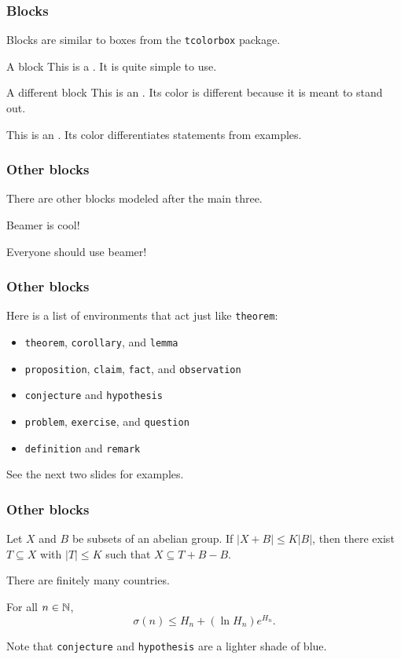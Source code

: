 \documentclass[mathserif]{beamer}
\begin{document}
\begin{frame}\frametitle{Blocks}
	Blocks are similar to boxes from the \texttt{tcolorbox} package.
	\begin{block}{A block}
		This is a . It is quite simple to use.
	\end{block}
	\pause
	\begin{alertblock}{A different block}
		This is an . Its color is different because it is meant to stand out.
	\end{alertblock}
	\pause
	\begin{examples}
		This is an . Its color differentiates statements from examples.
	\end{examples}
\end{frame}

\begin{frame}\frametitle{Other blocks}
	There are other blocks modeled after the main three.
	\pause
	\begin{theorem}
		Beamer is cool!
	\end{theorem}
	\begin{corollary}[Wright, 2003]
		Everyone should use beamer!
	\end{corollary}
\end{frame}

\begin{frame}\frametitle{Other blocks}
	Here is a list of environments that act just like \texttt{theorem}:
	\begin{itemize}
		\item \texttt{theorem}, \texttt{corollary}, and \texttt{lemma}
		\item \texttt{proposition}, \texttt{claim}, \texttt{fact}, and \texttt{observation}
		\item \texttt{conjecture} and \texttt{hypothesis}
		\item \texttt{problem}, \texttt{exercise}, and \texttt{question}
		\item \texttt{definition} and \texttt{remark}
	\end{itemize}
	See the next two slides for examples.
\end{frame}

\begin{frame}\frametitle{Other blocks}
	\begin{lemma}
		Let $X$ and $B$ be subsets of an abelian group. If $|X+B|\leq K|B|$, then there exist $T\subseteq X$ with $|T|\leq K$ such that $X\subseteq T+B-B$.
	\end{lemma}
	\begin{claim}
		There are finitely many countries.
	\end{claim}
	\begin{conjecture}
		For all $n\in\operatorname{\mathbb{N}}$,
		\[
			\sigma(n)\leq H_n+(\ln H_n)e^{H_n}.
		\]
	\end{conjecture}
	Note that \texttt{conjecture} and \texttt{hypothesis} are a lighter shade of blue.
\end{frame}
\end{document}
